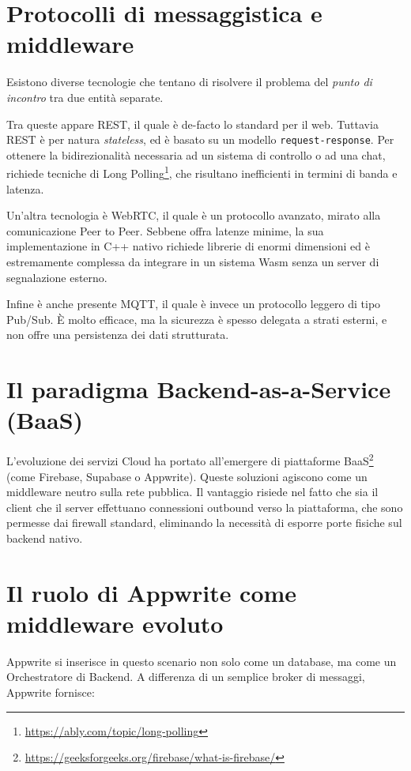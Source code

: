\documentclass[a4paper, 11pt, twoside]{report}
\begin{document}
\section{Protocolli di messaggistica e middleware}

Esistono diverse tecnologie che tentano di risolvere il problema del \textit{punto di incontro} tra due entità separate.

Tra queste appare \gls{REST}, il quale è de-facto lo standard per il web.
Tuttavia \gls{REST} è per natura \textit{stateless}, ed è basato su un modello \texttt{request-response}. Per ottenere la
bidirezionalità necessaria ad un sistema di controllo o ad una chat, richiede tecniche di Long Polling\footnote{\url{https://ably.com/topic/long-polling}},
che risultano inefficienti in termini di banda e latenza.

Un'altra tecnologia è WebRTC, il quale è un protocollo avanzato, mirato alla comunicazione Peer to Peer. Sebbene offra
latenze minime, la sua implementazione in C++ nativo richiede librerie di enormi dimensioni ed è estremamente complessa
da integrare in un sistema Wasm senza un server di segnalazione esterno.

Infine è anche presente \gls{MQTT}, il quale è invece un protocollo leggero di tipo Pub/Sub. È molto efficace, ma la sicurezza
è spesso delegata a strati esterni, e non offre una persistenza dei dati strutturata.

\section{Il paradigma Backend-as-a-Service (BaaS)}\label{sec:baas}

L'evoluzione dei servizi Cloud ha portato all'emergere di piattaforme BaaS\footnote{\url{https://geeksforgeeks.org/firebase/what-is-firebase/}}
(come Firebase, Supabase o Appwrite).
Queste soluzioni agiscono come un middleware neutro sulla rete pubblica. 
Il vantaggio risiede nel fatto che sia il client che il server effettuano connessioni outbound verso la piattaforma,
che sono permesse dai firewall standard, eliminando la necessità di esporre porte fisiche sul backend nativo.

\section{Il ruolo di Appwrite come middleware evoluto}

Appwrite si inserisce in questo scenario non solo come un database, ma come un Orchestratore di Backend.
A differenza di un semplice broker di messaggi, Appwrite fornisce:
\end{document}
